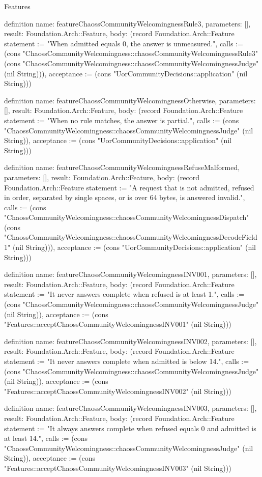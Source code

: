 \begin{lexlean}{Features}
\begin{semanticmodule}
definition{
  name: featureChaossCommunityWelcomingnessRule3,
  parameters: [],
  result: Foundation.Arch::Feature,
  body: (record Foundation.Arch::Feature {statement := "When admitted equals 0, the answer is unmeasured.", calls := (cons "ChaossCommunityWelcomingness::chaossCommunityWelcomingnessRule3" (cons "ChaossCommunityWelcomingness::chaossCommunityWelcomingnessJudge" (nil String))), acceptance := (cons "UorCommunityDecisions::application" (nil String))})
}

definition{
  name: featureChaossCommunityWelcomingnessOtherwise,
  parameters: [],
  result: Foundation.Arch::Feature,
  body: (record Foundation.Arch::Feature {statement := "When no rule matches, the answer is partial.", calls := (cons "ChaossCommunityWelcomingness::chaossCommunityWelcomingnessJudge" (nil String)), acceptance := (cons "UorCommunityDecisions::application" (nil String))})
}

definition{
  name: featureChaossCommunityWelcomingnessRefuseMalformed,
  parameters: [],
  result: Foundation.Arch::Feature,
  body: (record Foundation.Arch::Feature {statement := "A request that is not admitted, refused in order, separated by single spaces, or is over 64 bytes, is answered invalid.", calls := (cons "ChaossCommunityWelcomingness::chaossCommunityWelcomingnessDispatch" (cons "ChaossCommunityWelcomingness::chaossCommunityWelcomingnessDecodeField1" (nil String))), acceptance := (cons "UorCommunityDecisions::application" (nil String))})
}

definition{
  name: featureChaossCommunityWelcomingnessINV001,
  parameters: [],
  result: Foundation.Arch::Feature,
  body: (record Foundation.Arch::Feature {statement := "It never answers complete when refused is at least 1.", calls := (cons "ChaossCommunityWelcomingness::chaossCommunityWelcomingnessJudge" (nil String)), acceptance := (cons "Features::acceptChaossCommunityWelcomingnessINV001" (nil String))})
}

definition{
  name: featureChaossCommunityWelcomingnessINV002,
  parameters: [],
  result: Foundation.Arch::Feature,
  body: (record Foundation.Arch::Feature {statement := "It never answers complete when admitted is below 14.", calls := (cons "ChaossCommunityWelcomingness::chaossCommunityWelcomingnessJudge" (nil String)), acceptance := (cons "Features::acceptChaossCommunityWelcomingnessINV002" (nil String))})
}

definition{
  name: featureChaossCommunityWelcomingnessINV003,
  parameters: [],
  result: Foundation.Arch::Feature,
  body: (record Foundation.Arch::Feature {statement := "It always answers complete when refused equals 0 and admitted is at least 14.", calls := (cons "ChaossCommunityWelcomingness::chaossCommunityWelcomingnessJudge" (nil String)), acceptance := (cons "Features::acceptChaossCommunityWelcomingnessINV003" (nil String))})
}


\end{semanticmodule}
\end{lexlean}
